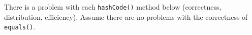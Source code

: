 There is a problem with each \lstinline$hashCode()$ method below (correctness,
distribution, efficiency). Assume there are no problems with the correctness of
\lstinline$equals()$.

